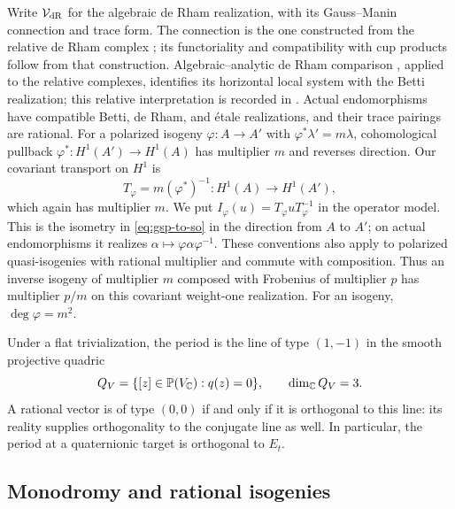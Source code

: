 Write $\mathcal V_{\mathrm{dR}}$ for the algebraic de Rham realization, with its
Gauss--Manin connection and trace form.  The connection is the one
constructed from the relative de Rham complex
\cite[Theorem~1]{KatzOda1968}; its functoriality and compatibility with
cup products follow from that construction.  Algebraic--analytic de Rham
comparison \cite[Theorem~1$'$]{Grothendieck1966DeRham}, applied
to the relative complexes, identifies its horizontal local system with
the Betti realization; this relative interpretation is recorded in
\cite[Section~0.0]{Katz1970}.  Actual endomorphisms have
compatible Betti, de Rham, and \'etale realizations, and their trace
pairings are rational.  For a polarized isogeny
$\varphi:A\to A'$ with $\varphi^*\lambda'=m\lambda$, cohomological
pullback $\varphi^*:H^1(A')\to H^1(A)$ has multiplier $m$ and reverses
direction.  Our covariant transport on $H^1$ is
\[
 T_\varphi=m(\varphi^*)^{-1}:H^1(A)\longrightarrow H^1(A'),
\]
which again has multiplier $m$.  We put
$I_\varphi(u)=T_\varphi uT_\varphi^{-1}$ in the operator model.  This is
the isometry in \eqref{eq:gsp-to-so} in the direction from $A$ to $A'$;
on actual endomorphisms it realizes
$\alpha\mapsto\varphi\alpha\varphi^{-1}$.  These conventions also apply
to polarized quasi-isogenies with rational multiplier and commute with
composition.  Thus an inverse isogeny of multiplier $m$ composed with
Frobenius of multiplier $p$ has multiplier $p/m$ on this covariant
weight-one realization.  For an isogeny, $\deg\varphi=m^2$.

Under a flat trivialization, the period is the line of type $(1,-1)$ in
the smooth projective quadric
\begin{equation}\label{eq:period-quadric}
 Q_V=\{[z]\in\mathbb P(V_{\mathbb C}):q(z)=0\},\qquad \dim_{\mathbb C}Q_V=3.
\end{equation}
A rational vector is of type $(0,0)$ if and only if it is orthogonal to
this line: its reality supplies orthogonality to the conjugate line as
well.  In particular, the period at a quaternionic target is orthogonal
to $E_t$.

\subsection{Monodromy and rational isogenies}

